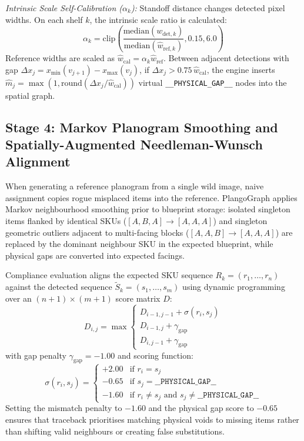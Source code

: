 \documentclass[conference]{IEEEtran}
\begin{document}
\textit{Intrinsic Scale Self-Calibration ($\alpha_k$):} Standoff distance changes detected pixel widths. On each shelf $k$, the intrinsic scale ratio is calculated:
\begin{equation}
\alpha_k = \text{clip}\left( \frac{\text{median}(w_{\text{det},k})}{\text{median}(\hat{w}_{\text{ref},k})}, 0.15, 6.0 \right)
\end{equation}
Reference widths are scaled as $\hat{w}_{\text{cal}} = \alpha_k \hat{w}_{\text{ref}}$. Between adjacent detections with gap $\Delta x_j = x_{\min}(v_{j+1}) - x_{\max}(v_j)$, if $\Delta x_j > 0.75\,\hat{w}_{\text{cal}}$, the engine inserts $\hat{m}_j = \max(1, \text{round}(\Delta x_j / \hat{w}_{\text{cal}}))$ virtual \texttt{\_\_PHYSICAL\_GAP\_\_} nodes into the spatial graph.

\subsection{Stage 4: Markov Planogram Smoothing and Spatially-Augmented Needleman-Wunsch Alignment}
When generating a reference planogram from a single wild image, naive assignment copies rogue misplaced items into the reference. PlangoGraph applies Markov neighbourhood smoothing prior to blueprint storage: isolated singleton items flanked by identical SKUs ($[A, B, A] \to [A, A, A]$) and singleton geometric outliers adjacent to multi-facing blocks ($[A, A, B] \to [A, A, A]$) are replaced by the dominant neighbour SKU in the expected blueprint, while physical gaps are converted into expected facings.

Compliance evaluation aligns the expected SKU sequence $R_k = (r_1, \dots, r_n)$ against the detected sequence $\tilde{S}_k = (s_1, \dots, s_m)$ using dynamic programming over an $(n+1) \times (m+1)$ score matrix $D$:
\begin{equation}
D_{i,j} = \max \begin{cases}
D_{i-1, j-1} + \sigma(r_i, s_j) \\
D_{i-1, j} + \gamma_{\text{gap}} \\
D_{i, j-1} + \gamma_{\text{gap}}
\end{cases}
\end{equation}
with gap penalty $\gamma_{\text{gap}} = -1.00$ and scoring function:
\begin{equation}
\sigma(r_i, s_j) = \begin{cases}
+2.00 & \text{if } r_i = s_j \\
-0.65 & \text{if } s_j = \texttt{\_\_PHYSICAL\_GAP\_\_} \\
-1.60 & \text{if } r_i \neq s_j \text{ and } s_j \neq \texttt{\_\_PHYSICAL\_GAP\_\_}
\end{cases}
\end{equation}
Setting the mismatch penalty to $-1.60$ and the physical gap score to $-0.65$ ensures that traceback prioritises matching physical voids to missing items rather than shifting valid neighbours or creating false substitutions.
\end{document}
